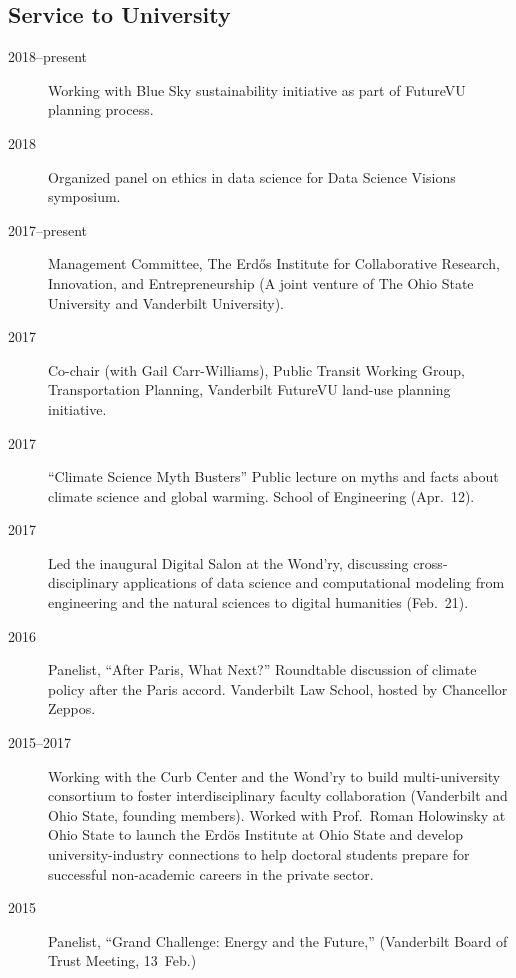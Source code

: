\documentclass[10pt]{article}
\begin{document}
    \subsection{Service to University}
        \begin{description}
            \item[2018--present] Working with Blue Sky sustainability initiative as part of FutureVU planning process.
            \item[2018] Organized panel on ethics in data science for Data Science Visions symposium.
            \item[2017--present] Management Committee, The Erd\H{o}s Institute for Collaborative Research, Innovation, and Entrepreneurship (A joint venture of The Ohio State University and Vanderbilt University).
            \item[2017] Co-chair (with Gail Carr-Williams), Public Transit Working Group, Transportation Planning, Vanderbilt FutureVU land-use planning initiative.
            \item[2017] ``Climate Science Myth Busters'' Public lecture on myths and facts about climate science and global warming. School of Engineering (Apr.~12).
            \item[2017] Led the inaugural Digital Salon at the Wond'ry, discussing cross-disciplinary applications of data science and computational modeling from engineering and the natural sciences to digital humanities (Feb.~21).
            \item[2016] Panelist, ``After Paris, What Next?''  Roundtable discussion of climate policy after the Paris accord. Vanderbilt Law School, hosted by Chancellor Zeppos.
            \item[2015--2017] Working with the Curb Center and the Wond'ry to build multi-university consortium to foster interdisciplinary faculty collaboration (Vanderbilt and Ohio State, founding members).  Worked with Prof.\ Roman Holowinsky at Ohio State to launch the Erd\"os Institute at Ohio State and develop university-industry connections to help doctoral students prepare for successful non-academic careers in the private sector.
            \item[2015] Panelist, ``Grand Challenge: Energy and the Future,'' (Vanderbilt Board of Trust Meeting, 13~Feb.)

\end{description}
\end{document}
